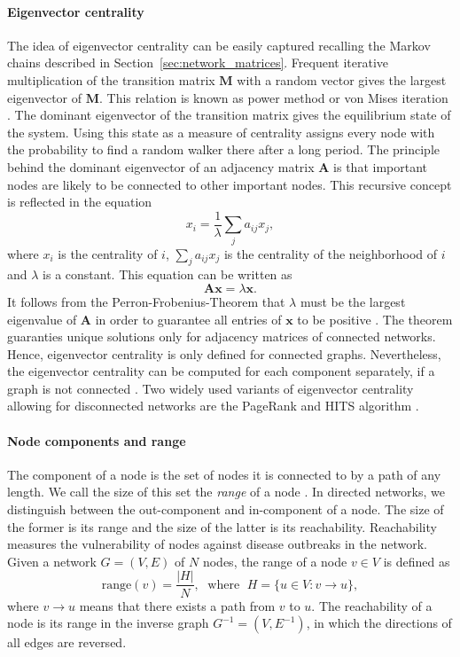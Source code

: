 \paragraph{Eigenvector centrality\color{Cayenne}{.}}
The idea of eigenvector centrality can be easily captured recalling the Markov chains described in Section~\ref{sec:network_matrices}.
Frequent iterative multiplication of the transition matrix $\mathbf{M}$ with a random vector gives the largest eigenvector of $\mathbf{M}$.
This relation is known as power method or von Mises iteration \citep{van_mises}.
The dominant eigenvector of the transition matrix gives the equilibrium state of the system.
Using this state as a measure of centrality assigns every node with the probability to find a random walker there after a long period.
The principle behind the dominant eigenvector of an adjacency matrix $\mathbf{A}$ is that important nodes are likely to be connected to other important nodes.
This recursive concept is reflected in the equation
\[
x_i =\frac{1}{\lambda } \sum _j a_{ij} x_j ,
\]
where $x_i$ is the centrality of $i$, $\sum _j a_{ij} x_j$ is the centrality of the neighborhood of $i$ and $\lambda $ is a constant.
This equation can be written as
\begin{equation}
\mathbf{Ax}=\lambda \mathbf{x}.
\end{equation}
It follows from the Perron-Frobenius-Theorem that $\lambda $ must be the largest eigenvalue of $\mathbf{A}$ in order to guarantee all entries of $\mathbf{x}$ to be positive \citep{Bonacich:1972,Bonacich:2007}.
The theorem guaranties unique solutions only for adjacency matrices of connected networks.
Hence, eigenvector centrality is only defined for connected graphs.
Nevertheless, the eigenvector centrality can be computed for each component separately, if a graph is not connected \citep{Bonacich:2007}.
Two widely used variants of eigenvector centrality allowing for disconnected networks are the PageRank and HITS algorithm \citep{Kleinberg:1999,PageRank:}.

\paragraph{Node components and range\color{Cayenne}{.}}
The component of a node is the set of nodes it is connected to by a path of any length.
We call the size of this set the \emph{range} of a node \citep{Lentz:2012pre}.
In directed networks, we distinguish between the out-component and in-component of a node.
The size of the former is its range and the size of the latter is its reachability.
Reachability measures the vulnerability of nodes against disease outbreaks in the network.
Given a network $G=(V,E)$ of $N$ nodes, the range of a node $v \in V$ is defined as
\begin{equation}\label{eq:range_def}
\mathrm{range}(v)=\frac{\left| H \right| }{N}, \; \text{ where } \; H=\{u \in V: v\rightarrow u \},
\end{equation}
where $ v\rightarrow u $ means that there exists a path from $v$ to $u$.
The reachability of a node is its range in the inverse graph $G^{-1}=(V,E^{-1})$, in which the directions of all edges are reversed. 

